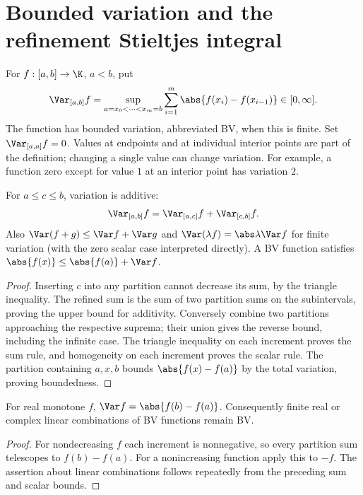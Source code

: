\chapter{Bounded variation and the refinement Stieltjes integral}

\begin{definition}
For $f:[a,b]\to\K$, $a<b$, put
\[\Var_{[a,b]}f=\sup_{a=x_0<\cdots<x_m=b}\sum_{i=1}^m\abs{f(x_i)-f(x_{i-1})}\in[0,\infty].\]
The function has bounded variation, abbreviated BV, when this is finite. Set $\Var_{[a,a]}f=0$. Values at endpoints and at individual interior points are part of the definition; changing a single value can change variation. For example, a function zero except for value $1$ at an interior point has variation $2$.
\end{definition}

\begin{theorem}
For $a\leq c\leq b$, variation is additive:
\[\Var_{[a,b]}f=\Var_{[a,c]}f+\Var_{[c,b]}f.\]
Also $\Var(f+g)\leq\Var f+\Var g$ and $\Var(\lambda f)=\abs\lambda\Var f$ for finite variation (with the zero scalar case interpreted directly). A BV function satisfies $\abs{f(x)}\leq\abs{f(a)}+\Var f$.
\end{theorem}
\begin{proof}
Inserting $c$ into any partition cannot decrease its sum, by the triangle inequality. The refined sum is the sum of two partition sums on the subintervals, proving the upper bound for additivity. Conversely combine two partitions approaching the respective suprema; their union gives the reverse bound, including the infinite case. The triangle inequality on each increment proves the sum rule, and homogeneity on each increment proves the scalar rule. The partition containing $a,x,b$ bounds $\abs{f(x)-f(a)}$ by the total variation, proving boundedness.
\end{proof}

\begin{theorem}
For real monotone $f$, $\Var f=\abs{f(b)-f(a)}$. Consequently finite real or complex linear combinations of BV functions remain BV.
\end{theorem}
\begin{proof}
For nondecreasing $f$ each increment is nonnegative, so every partition sum telescopes to $f(b)-f(a)$. For a nonincreasing function apply this to $-f$. The assertion about linear combinations follows repeatedly from the preceding sum and scalar bounds.
\end{proof}

